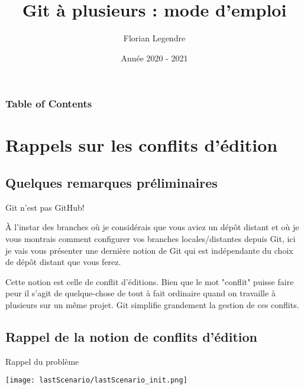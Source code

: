 \documentclass{beamer}
\title[Git collaboratif]{Git à plusieurs : mode d'emploi}
\author{Florian Legendre}
\institute{Université de Poitiers}
\date{Année 2020 - 2021}
\begin{document}
\frame{\titlepage}

\begin{frame}
\frametitle{Table of Contents}
\tableofcontents[hideallsubsections]
\end{frame}





\section{Rappels sur les conflits d'édition}

\subsection{Quelques remarques préliminaires}
\begin{frame}{Git n'est pas GitHub!}

À l'instar des branches où je considérais que vous aviez un dépôt distant et où je vous  montrais comment configurer vos branches locales/distantes depuis Git, ici je vais vous présenter une dernière notion de Git qui est indépendante du choix de dépôt distant que vous ferez.\\
\medskip

Cette notion est celle de conflit d'éditions. Bien que le mot "conflit" puisse faire peur il s'agit de quelque-chose de tout à fait ordinaire quand on travaille à plusieurs sur un même projet. Git simplifie grandement la gestion de ces conflits.\\

\end{frame}

\subsection{Rappel de la notion de conflits d'édition}
\begin{frame}{Rappel du problème}
\begin{center}
    \texttt{[image: lastScenario/lastScenario\_init.png]}
\end{center}
\end{frame}
\end{document}
